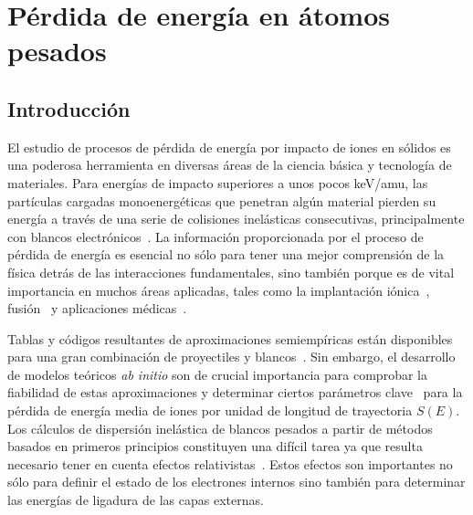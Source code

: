 \chapter{Pérdida de energía en átomos pesados}
\label{chap:heavy}

\section{Introducción}
\label{sec:intro}

El estudio de procesos de pérdida de energía por impacto de iones 
en sólidos es una poderosa herramienta en diversas áreas de la ciencia
básica y tecnología de materiales. Para energías de impacto superiores 
a unos pocos keV/amu, las partículas cargadas monoenergéticas que 
penetran algún material pierden su energía a través de una serie de 
colisiones inelásticas consecutivas, principalmente con blancos
electrónicos~\cite{Chu:01,Sigmund:06}. La información proporcionada por 
el proceso de pérdida de energía es esencial no sólo para tener una 
mejor comprensión de la física detrás de las interacciones 
fundamentales, sino también porque es de vital importancia en muchos 
áreas aplicadas, tales como la implantación 
iónica~\cite{Creutzburg:19,Jeynes:16}, 
fusión~\cite{Mayer:20,He:17} y aplicaciones 
médicas~\cite{Schardt:10,AlcocerAvila:19,Vera:19}.

Tablas y códigos resultantes de aproximaciones semiempíricas están 
disponibles para una gran combinación de proyectiles y 
blancos~\cite{iaea_codes,Paul:03}. Sin embargo, el desarrollo de modelos
teóricos \textit{ab initio} son de crucial importancia para comprobar la 
fiabilidad de estas aproximaciones y determinar ciertos parámetros 
clave~\cite{Diwan:15,Damache:04,Damache:02} para la pérdida de energía 
media de iones por unidad de longitud de trayectoria $S(E)$. Los 
cálculos de dispersión inelástica de blancos pesados a partir de métodos 
basados en primeros principios constituyen una difícil tarea ya que 
resulta necesario tener en cuenta efectos 
relativistas~\cite{Montanari:09}. Estos efectos son importantes no sólo 
para definir el estado de los electrones internos sino también para 
determinar las energías de ligadura de las capas externas.


